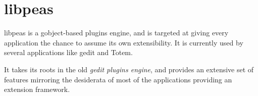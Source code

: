 
\section[libpeas]{libpeas\cite{website:libpeas}}\label{sec:peas}

libpeas is a gobject-based plugins engine, and is targeted at giving every application the chance to assume its own extensibility. It is currently used by several \GNOME applications like gedit and Totem.

It takes its roots in the old \emph{gedit plugins engine}, and provides an extensive set of features mirroring the desiderata of most of the applications providing an extension framework.
